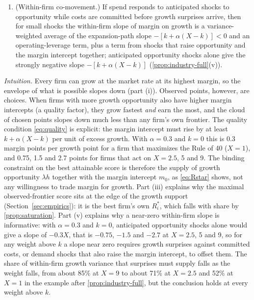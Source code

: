 \begin{proposition}
\begin{enumerate}
\item[(v)] (Within-firm co-movement.) If spend responds to anticipated shocks to opportunity while costs are committed before growth surprises arrive, then for small shocks the within-firm slope of margin on growth is a variance-weighted average of the expansion-path slope $-[k+\alpha(X-k)]<0$ and an operating-leverage term, plus a term from shocks that raise opportunity and the margin intercept together; anticipated opportunity shocks alone give the strongly negative slope $-[k+\alpha(X-k)]$ (\autoref{prop:industry-full}(v)).
\end{enumerate}
\end{proposition}

\noindent\emph{Intuition.} Every firm can grow at the market rate at its highest margin, so the envelope of what is possible slopes down (part (i)). Observed points, however, are choices. When firms with more growth opportunity also have higher margin intercepts (a quality factor), they grow fastest \emph{and} earn the most, and the cloud of chosen points slopes down much less than any firm's own frontier. The quality condition \eqref{eq:quality} is explicit: the margin intercept must rise by at least $k+\alpha(X-k)$ per unit of excess growth. With $\alpha=0.3$ and $k=0$ this is 0.3 margin points per growth point for a firm that maximizes the Rule of 40 ($X=1$), and 0.75, 1.5 and 2.7 points for firms that act on $X=2.5$, 5 and 9. The binding constraint on the best attainable score is therefore the supply of growth opportunity $\lambda h$ together with the margin intercept $m_0$, as \eqref{eq:Rstar} shows, not any willingness to trade margin for growth. Part (iii) explains why the maximal observed-frontier score sits at the edge of the growth support (Section~\ref{sec:empirics}): it is the best firm's own $R_i^*$, which falls with share by \autoref{prop:saturation}. Part (v) explains why a near-zero within-firm slope is informative: with $\alpha=0.3$ and $k=0$, anticipated opportunity shocks alone would give a slope of $-0.3X$, that is $-0.75$, $-1.5$ and $-2.7$ at $X=2.5$, 5 and 9, so for any weight above $k$ a slope near zero requires growth surprises against committed costs, or demand shocks that also raise the margin intercept, to offset them. The share of within-firm growth variance that surprises must supply falls as the weight falls, from about 85\% at $X=9$ to about 71\% at $X=2.5$ and 52\% at $X=1$ in the example after \autoref{prop:industry-full}, but the conclusion holds at every weight above $k$.

